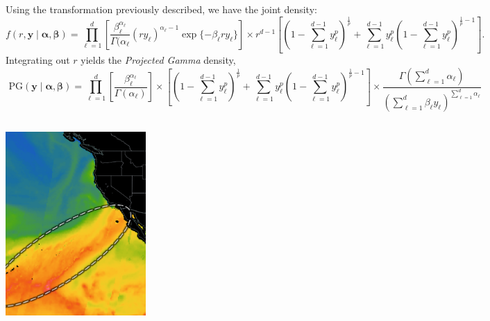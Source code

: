 \documentclass[25pt, a0paper, portrait]{tikzposter}
\begin{document}
\begin{columns}
{    Using the transformation previously described, we have the joint density:
    \[
        f(r,\bm{y}\mid\bm{\alpha},\bm{\beta}) = \prod_{\ell = 1}^d \left[ \frac{\beta_{\ell}^{\alpha_{\ell}}}{\Gamma(\alpha_{\ell}}
            (ry_{\ell})^{\alpha_{\ell} - 1}\exp\lbrace-\beta_{\ell}ry_{\ell}\rbrace\right]\times 
            r^{d-1}\left[\left(1 - \sum_{\ell = 1}^{d-1}y_{\ell}^p\right)^{\frac{1}{p}} +
            \sum_{\ell = 1}^{d-1}y_{\ell}^p\left(1 - \sum_{\ell = 1}^{d-1}y_{\ell}^p\right)^{\frac{1}{p} - 1}\right].
    \]
    Integrating out $r$ yields the \emph{Projected Gamma} density,
    \[
    \text{PG}\left(\bm{y}\mid\bm{\alpha},\bm{\beta}\right) = \prod_{\ell = 1}^d
        \left[\frac{\beta_{\ell}^{\alpha_{\ell}}}{\Gamma(\alpha_{\ell})}\right]
        \times \left[\left(1 - \sum_{\ell = 1}^{d-1}y_{\ell}^p\right)^{\frac{1}{p}} +
            \sum_{\ell = 1}^{d-1}y_{\ell}^p\left(1 - \sum_{\ell = 1}^{d-1}y_{\ell}^p\right)^{\frac{1}{p} - 1}\right]
        \times 
        \frac{\Gamma\left(\sum_{\ell = 1}^d\alpha_{\ell}\right)}{\left(\sum_{\ell = 1}^d
                \beta_{\ell}y_{\ell}\right)^{\sum_{\ell = 1}^d\alpha_{\ell}}}
    \]
    }

\end{columns}
\begin{columns}
    {
        \begin{tikzfigure}
            \includegraphics[width=0.4\textwidth]{images/ar}
        \end{tikzfigure}
    }
\end{columns}
\end{document}
